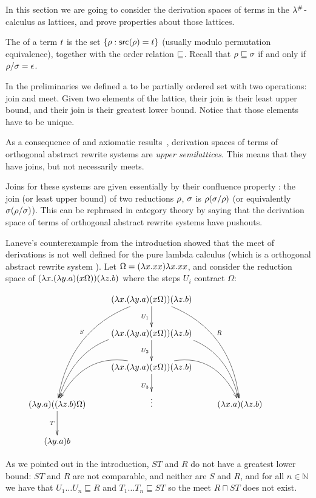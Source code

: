 In this section we are going to consider the derivation spaces of terms in
the $\lambda^{\mathtt{\#}}$-calculus as lattices, and prove properties about those lattices.

The  of a term $t$ is the set
$\{\rho : \mathsf{src}(\rho) = t\}$ (usually modulo permutation equivalence),
together with the order relation $\sqsubseteq$.
Recall that
$\rho \sqsubseteq \sigma$ if and only if $\rho / \sigma = \epsilon$.

In the preliminaries we defined a  to be partially ordered set with two operations:
join and meet. Given two elements of the lattice, their join is their least upper bound,
and their join is their greatest lower bound. Notice that those elements have to be unique.

As a consequence of
and axiomatic results~\cite{thesismellies},
derivation spaces of terms of orthogonal abstract rewrite systems are
\emph{upper semilattices}. This means that they have joins, but not necessarily meets.

Joins for these systems are given essentially by their confluence property :
the join (or least upper bound)
of two reductions $\rho$, $\sigma$ is $\rho (\sigma / \rho)$
(or equivalently $\sigma (\rho / \sigma)$).
This can be rephrased in category theory by saying that the derivation space of
terms of orthogonal abstract rewrite systems have pushouts.

\begin{example} Laneve's counterexample from the introduction
showed that the meet of derivations is not well defined for the pure lambda calculus
(which is a orthogonal abstract rewrite system \cite{thesismellies}).
Let $\Omega = (\lambda x. xx)\lambda x. xx$,
and consider the reduction space of
$(\lambda x. (\lambda y. a)(x \Omega)) (\lambda z. b)$
where the steps $U_i$ contract $\Omega$:

\[
  \xymatrix{
    &
    (\lam{\var}{(\lam{\vartwo}{a})(\var \Omega)}) (\lam{\varthree}{b})
    \ar_{U_1}[d]
    \ar@/_1cm/_{S}[dddl]
    \ar@/^1cm/^{R}[dddr]
    &
  \\
    &
    (\lam{\var}{(\lam{\vartwo}{a})(\var \Omega)}) (\lam{\varthree}{b})
    \ar@/_1cm/[ddl] \ar@/^1cm/[ddr]
    \ar_{U_2}[d]
    &
  \\
    &
    (\lam{\var}{(\lam{\vartwo}{a})(\var \Omega)}) (\lam{\varthree}{b})
    \ar@/_1cm/[dl] \ar@/^1cm/[dr]
    \ar_{U_3}[d]
    &
  \\
    (\lam{\vartwo}{a})((\lam{\varthree}{b}) \Omega)
    \ar_{T}[d]
    &
    \vdots
    &
    (\lam{\var}{a})(\lam{\varthree}{b})
  \\
    (\lam{\vartwo}{a}) b
    &
    &
    &
  }
\]

As we pointed out in the introduction,
$ST$ and $R$ do not have a greatest lower bound: $ST$ and $R$ are not
comparable, and neither are $S$ and $R$,
and for all $n \in \mathbb{N}$ we have that $U_1 \hdots U_n \sqsubseteq R$
and $T_1 \hdots T_n \sqsubseteq ST$ so the meet $R \sqcap ST$ does not exist.
\end{example}

